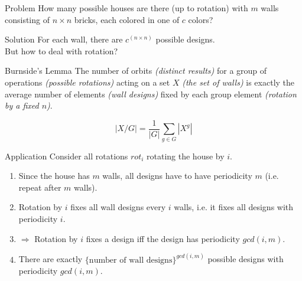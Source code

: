 \begin{slide}
    \begin{block}{Problem}
    	How many possible houses are there (up to rotation) with $m$ walls consisting of $n \times n$ bricks, each colored in one of $c$ colors?
    \end{block}

    \begin{block}{Solution}
        For each wall, there are $c^{(n \times n)}$ possible designs. 
        \\
        But how to deal with rotation?

    \end{block}
\end{slide}

\begin{slide}
    \begin{block}{Burnside's Lemma}
        The number of orbits \textit{(distinct results)} for a group of operations \textit{(possible rotations)} acting on a set $X$ \textit{(the set of walls)} is exactly the average number of elements \textit{(wall designs)} fixed by each group element \textit{(rotation by a fixed $n$)}.

        \[ \left|X/G\right| = \frac{1}{\left|G\right|} \sum\limits_{g \in G} \left| X ^ g \right| \]
    \end{block}
\end{slide}

\begin{slide}
    \begin{block}{Application}
        Consider all rotations $\mathit{rot}_i$ rotating the house by $i$.
        \begin{enumerate}
            \item Since the house has $m$ walls, all designs have to have periodicity $m$ (i.e. repeat after $m$ walls).
            \item Rotation by $i$ fixes all wall designs every $i$ walls, i.e. it fixes all designs with periodicity $i$.
            \item $\Rightarrow$ Rotation by $i$ fixes a design iff the design has periodicity $\mathit{gcd}(i,m)$.
            \item There are exactly $\{\text{number of wall designs}\}^{\mathit{gcd}(i,m)}$ possible designs with periodicity $\mathit{gcd}(i,m)$.
        \end{enumerate}
    \end{block}
\end{slide}

